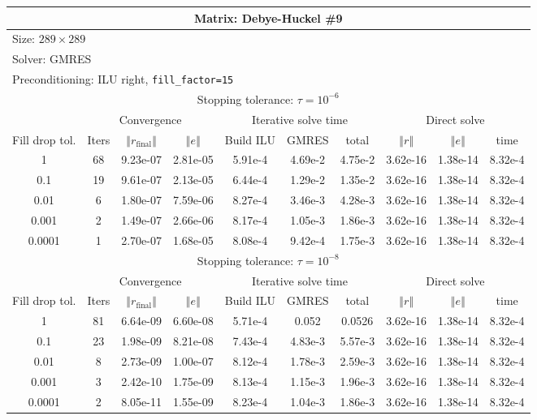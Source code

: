 \documentclass[oneside,final]{amsart}  %
\begin{document}
\begin{tabular}{|c|c|c|c|c|c|c|c|c|c|}
\hline
\multicolumn{10}{|c|}{Matrix: Debye-Huckel \#9}\tabularnewline
\hline
\multicolumn{10}{|l|}{Size: $289\times289$}\tabularnewline
\hline
\multicolumn{10}{|l|}{Solver: GMRES}\tabularnewline
\hline
\multicolumn{10}{|l|}{Preconditioning: ILU right, \texttt{fill\_factor=15}}\tabularnewline
\hline
\hline
\multicolumn{10}{|c|}{Stopping tolerance: $\tau=10^{-6}$}\tabularnewline
\hline
\hline
 & \multicolumn{3}{c|}{Convergence} & \multicolumn{3}{c|}{Iterative solve time} & \multicolumn{3}{c|}{Direct solve}\tabularnewline
\hline
Fill drop tol.  & Iters & $\left\Vert r_{\text{final}}\right\Vert $  & $\left\Vert e\right\Vert $  & Build ILU  & GMRES  & total  & $\left\Vert r\right\Vert $ & $\left\Vert e\right\Vert $  & time\tabularnewline
\hline
1       & 68  & 9.23e-07 & 2.81e-05 & 5.91e-4 & 4.69e-2 & 4.75e-2 & 3.62e-16 & 1.38e-14 &   8.32e-4\\
  \hline
0.1     & 19  & 9.61e-07 & 2.13e-05 & 6.44e-4 & 1.29e-2 & 1.35e-2 & 3.62e-16 & 1.38e-14 &   8.32e-4\\
  \hline
0.01    & 6   & 1.80e-07 & 7.59e-06 & 8.27e-4 & 3.46e-3 & 4.28e-3 & 3.62e-16 & 1.38e-14 &   8.32e-4\\
  \hline
0.001   & 2   & 1.49e-07 & 2.66e-06 & 8.17e-4 & 1.05e-3 & 1.86e-3 & 3.62e-16 & 1.38e-14 &   8.32e-4\\
  \hline
0.0001  & 1   & 2.70e-07 & 1.68e-05 & 8.08e-4 & 9.42e-4 & 1.75e-3 & 3.62e-16 & 1.38e-14 &   8.32e-4\\
  \hline
\hline
\multicolumn{10}{|c|}{Stopping tolerance: $\tau=10^{-8}$}\tabularnewline
\hline
\hline
 & \multicolumn{3}{c|}{Convergence} & \multicolumn{3}{c|}{Iterative solve time} & \multicolumn{3}{c|}{Direct solve }\tabularnewline
\hline
Fill drop tol.  & Iters  & $\left\Vert r_{\text{final}}\right\Vert $  & $\left\Vert e\right\Vert $ & Build ILU  & GMRES  & total  & $\left\Vert r\right\Vert $  & $\left\Vert e\right\Vert $  & time\tabularnewline
\hline
1      & 81  & 6.64e-09 & 6.60e-08 & 5.71e-4 &   0.052 &  0.0526 & 3.62e-16 & 1.38e-14 &   8.32e-4\\
  \hline
0.1    & 23  & 1.98e-09 & 8.21e-08 & 7.43e-4 & 4.83e-3 & 5.57e-3 & 3.62e-16 & 1.38e-14 &   8.32e-4\\
  \hline
0.01   & 8   & 2.73e-09 & 1.00e-07 & 8.12e-4 & 1.78e-3 & 2.59e-3 & 3.62e-16 & 1.38e-14 &   8.32e-4\\
  \hline
0.001  & 3   & 2.42e-10 & 1.75e-09 & 8.13e-4 & 1.15e-3 & 1.96e-3 & 3.62e-16 & 1.38e-14 &   8.32e-4\\
  \hline
0.0001 & 2   & 8.05e-11 & 1.55e-09 & 8.23e-4 & 1.04e-3 & 1.86e-3 & 3.62e-16 & 1.38e-14 &   8.32e-4\\
  \hline
\end{tabular}
\end{document}
